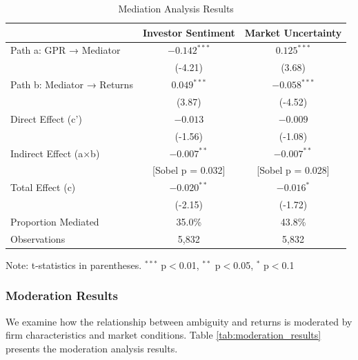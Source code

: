 \documentclass[12pt]{article}
\begin{document}
\begin{table}[htbp]
\centering
\caption{Mediation Analysis Results}
\label{tab:mediation_results}
\begin{tabular}{lcc}
\toprule
 & Investor Sentiment & Market Uncertainty \\
\midrule
Path a: GPR → Mediator & $-0.142^{***}$ & $0.125^{***}$ \\
 & (-4.21) & (3.68) \\
Path b: Mediator → Returns & $0.049^{***}$ & $-0.058^{***}$ \\
 & (3.87) & (-4.52) \\
Direct Effect (c') & $-0.013$ & $-0.009$ \\
 & (-1.56) & (-1.08) \\
Indirect Effect (a×b) & $-0.007^{**}$ & $-0.007^{**}$ \\
 & [Sobel p = 0.032] & [Sobel p = 0.028] \\
Total Effect (c) & $-0.020^{**}$ & $-0.016^{*}$ \\
 & (-2.15) & (-1.72) \\
\midrule
Proportion Mediated & 35.0\% & 43.8\% \\
Observations & 5,832 & 5,832 \\
\bottomrule
\end{tabular}
\footnotesize
Note: t-statistics in parentheses. $^{***}$ p$<$0.01, $^{**}$ p$<$0.05, $^{*}$ p$<$0.1
\end{table}

\subsubsection{Moderation Results}

We examine how the relationship between ambiguity and returns is moderated by firm characteristics and market conditions. Table \ref{tab:moderation_results} presents the moderation analysis results.
\end{document}
